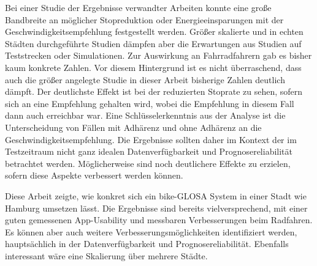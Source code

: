 Bei einer Studie der Ergebnisse verwandter Arbeiten konnte eine große Bandbreite an möglicher Stopreduktion oder Energieeinsparungen mit der Geschwindigkeitsempfehlung festgestellt werden. Größer skalierte und in echten Städten durchgeführte Studien dämpfen aber die Erwartungen aus Studien auf Teststrecken oder Simulationen. Zur Auswirkung an Fahrradfahrern gab es bisher kaum konkrete Zahlen. Vor diesem Hintergrund ist es nicht überraschend, dass auch die größer angelegte Studie in dieser Arbeit bisherige Zahlen deutlich dämpft. Der deutlichste Effekt ist bei der reduzierten Stoprate zu sehen, sofern sich an eine Empfehlung gehalten wird, wobei die Empfehlung in diesem Fall dann auch erreichbar war. Eine Schlüsselerkenntnis aus der Analyse ist die Unterscheidung von Fällen mit Adhärenz und ohne Adhärenz an die Geschwindigkeitsempfehlung. Die Ergebnisse sollten daher im Kontext der im Testzeitraum nicht ganz idealen Datenverfügbarkeit und Prognosereliabilität betrachtet werden. Möglicherweise sind noch deutlichere Effekte zu erzielen, sofern diese Aspekte verbessert werden können. 

Diese Arbeit zeigte, wie konkret sich ein bike-GLOSA System in einer Stadt wie Hamburg umsetzen lässt. Die Ergebnisse sind bereits vielversprechend, mit einer guten gemessenen App-Usability und messbaren Verbesserungen beim Radfahren. Es können aber auch weitere Verbesserungsmöglichkeiten identifiziert werden, hauptsächlich in der Datenverfügbarkeit und Prognosereliabilität. Ebenfalls interessant wäre eine Skalierung über mehrere Städte.
